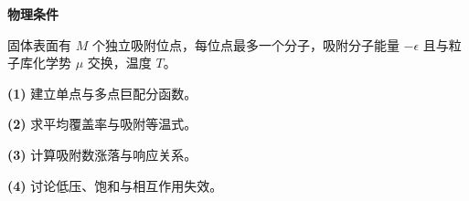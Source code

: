 \textbf{物理条件}\par 固体表面有 \(M\) 个独立吸附位点，每位点最多一个分子，吸附分子能量 \(-\epsilon\) 且与粒子库化学势 \(\mu\) 交换，温度 \(T\)。
\par\noindent\textbf{(1)} 建立单点与多点巨配分函数。
\par\noindent\textbf{(2)} 求平均覆盖率与吸附等温式。
\par\noindent\textbf{(3)} 计算吸附数涨落与响应关系。
\par\noindent\textbf{(4)} 讨论低压、饱和与相互作用失效。
